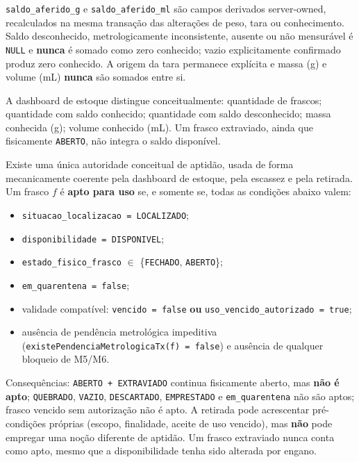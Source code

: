 \begin{regra}
\texttt{saldo\_aferido\_g} e \texttt{saldo\_aferido\_ml} são campos derivados server-owned, recalculados na mesma transação das alterações de peso, tara ou conhecimento. Saldo desconhecido, metrologicamente inconsistente, ausente ou não mensurável é \texttt{NULL} e \textbf{nunca} é somado como zero conhecido; vazio explicitamente confirmado produz zero conhecido. A origem da tara permanece explícita e massa (g) e volume (mL) \textbf{nunca} são somados entre si.

A dashboard de estoque distingue conceitualmente: quantidade de frascos; quantidade com saldo conhecido; quantidade com saldo desconhecido; massa conhecida (g); volume conhecido (mL). Um frasco extraviado, ainda que fisicamente \texttt{ABERTO}, não integra o saldo disponível.
\end{regra}

\begin{regra}
Existe uma única autoridade conceitual de aptidão, usada de forma mecanicamente coerente pela dashboard de estoque, pela escassez e pela retirada. Um frasco $f$ é \textbf{apto para uso} se, e somente se, todas as condições abaixo valem:
\begin{itemize}
    \item \texttt{situacao\_localizacao = LOCALIZADO};
    \item \texttt{disponibilidade = DISPONIVEL};
    \item \texttt{estado\_fisico\_frasco} $\in$ \{\texttt{FECHADO}, \texttt{ABERTO}\};
    \item \texttt{em\_quarentena = false};
    \item validade compatível: \texttt{vencido = false} \textbf{ou} \texttt{uso\_vencido\_autorizado = true};
    \item ausência de pendência metrológica impeditiva (\texttt{existePendenciaMetrologicaTx(f) = false}) e ausência de qualquer bloqueio de M5/M6.
\end{itemize}
Consequências: \texttt{ABERTO + EXTRAVIADO} continua fisicamente aberto, mas \textbf{não é apto}; \texttt{QUEBRADO}, \texttt{VAZIO}, \texttt{DESCARTADO}, \texttt{EMPRESTADO} e \texttt{em\_quarentena} não são aptos; frasco vencido sem autorização não é apto. A retirada pode acrescentar pré-condições próprias (escopo, finalidade, aceite de uso vencido), mas \textbf{não} pode empregar uma noção diferente de aptidão. Um frasco extraviado nunca conta como apto, mesmo que a disponibilidade tenha sido alterada por engano.
\end{regra}

